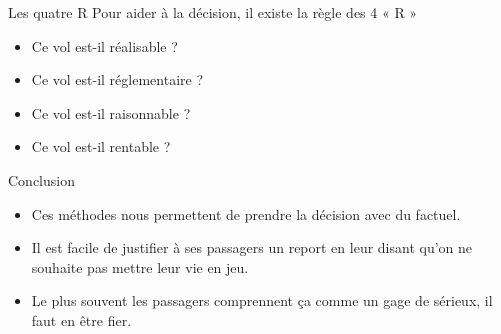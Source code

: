 \documentclass{beamer}
\begin{document}
\begin{frame}{Les quatre R}
  Pour aider à la décision, il existe la règle des 4 « R »
  \begin{itemize}
    \item Ce vol est-il réalisable ? \pause
    \item Ce vol est-il réglementaire ? \pause
    \item Ce vol est-il raisonnable ? \pause
    \item Ce vol est-il rentable ? \pause
  \end{itemize}  
\end{frame}

\begin{frame}{Conclusion}
  \begin{itemize}
    \item Ces méthodes nous permettent de prendre la décision avec du factuel. \pause
    \item Il est facile de justifier à ses passagers un report en leur disant qu'on ne souhaite pas mettre leur vie en jeu. \pause
    \item Le plus souvent les passagers comprennent ça comme un gage de sérieux, il faut en être fier.
  \end{itemize}  
\end{frame}
\end{document}
